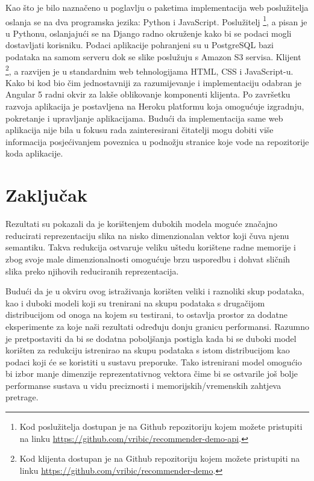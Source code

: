\documentclass[times, utf8, proizvoljni, numeric]{fer}
\begin{document}
Kao što je bilo naznačeno u poglavlju o paketima implementacija web poslužitelja oslanja se na dva programska jezika: Python i JavaScript. Poslužitelj \footnote{Kod poslužitelja dostupan je na Github repozitoriju kojem možete pristupiti na linku \url{https://github.com/vribic/recommender-demo-api}.}, a pisan je u Pythonu, oslanjajući se na Django radno okruženje kako bi se podaci mogli dostavljati korisniku. Podaci aplikacije pohranjeni su u PostgreSQL bazi podataka na samom serveru dok se slike poslužuju s Amazon S3 servisa. Klijent \footnote{Kod klijenta dostupan je na Github repozitoriju kojem možete pristupiti na linku \url{https://github.com/vribic/recommender-demo}.}, a razvijen je u standardnim web tehnologijama HTML, CSS i JavaScript-u. Kako bi kod bio čim jednostavniji za razumijevanje i implementaciju odabran je Angular 5 radni okvir za lakše oblikovanje komponenti klijenta. Po završetku razvoja aplikacija je postavljena na Heroku platformu koja omogućuje izgradnju, pokretanje i upravljanje aplikacijama. Budući da implementacija same web aplikacija nije bila u fokusu rada zainteresirani čitatelji mogu dobiti više informacija posjećivanjem poveznica u podnožju stranice koje vode na repozitorije koda aplikacije.



\chapter{Zaključak}

Rezultati su pokazali da je korištenjem dubokih modela moguće značajno reducirati reprezentaciju slika na nisko dimenzionalan vektor koji čuva njenu semantiku. Takva redukcija ostvaruje veliku uštedu korištene radne memorije i zbog svoje male dimenzionalnosti omogućuje brzu usporedbu i dohvat sličnih slika preko njihovih reduciranih reprezentacija. 

Budući da je u okviru ovog istraživanja korišten veliki i raznoliki skup podataka, kao i duboki modeli koji su trenirani na skupu podataka s drugačijom distribucijom od onoga na kojem su testirani, to ostavlja prostor za dodatne eksperimente za koje naši rezultati određuju donju granicu performansi. Razumno je pretpostaviti da bi se dodatna poboljšanja postigla kada bi se duboki model korišten za redukciju istrenirao na skupu podataka s istom distribucijom kao podaci koji će se koristiti u sustavu preporuke. Tako istrenirani model omogućio bi izbor manje dimenzije reprezentativnog vektora čime bi se ostvarile još bolje performanse sustava u vidu preciznosti i memorijskih/vremenskih zahtjeva pretrage.
\end{document}

